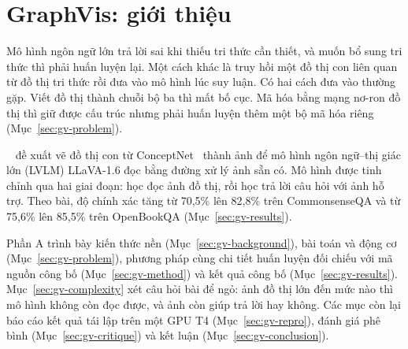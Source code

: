 \section{GraphVis: giới thiệu}\label{sec:gv-intro}

Mô hình ngôn ngữ lớn trả lời sai khi thiếu tri thức cần thiết, và muốn bổ sung tri thức thì phải huấn luyện lại. Một cách khác là truy hồi một đồ thị con liên quan từ đồ thị tri thức rồi đưa vào mô hình lúc suy luận. Có hai cách đưa vào thường gặp. Viết đồ thị thành chuỗi bộ ba thì mất bố cục. Mã hóa bằng mạng nơ-ron đồ thị thì giữ được cấu trúc nhưng phải huấn luyện thêm một bộ mã hóa riêng (Mục~\ref{sec:gv-problem}).

\GV{}~\cite{deng2024graphvis} đề xuất vẽ đồ thị con từ ConceptNet~\cite{speer2017conceptnet} thành ảnh để mô hình ngôn ngữ--thị giác lớn (LVLM) LLaVA-1.6 đọc bằng đường xử lý ảnh sẵn có. Mô hình được tinh chỉnh qua hai giai đoạn: học đọc ảnh đồ thị, rồi học trả lời câu hỏi với ảnh hỗ trợ. Theo bài, độ chính xác tăng từ 70,5\% lên 82,8\% trên CommonsenseQA và từ 75,6\% lên 85,5\% trên OpenBookQA (Mục~\ref{sec:gv-results}).

Phần A trình bày kiến thức nền (Mục~\ref{sec:gv-background}), bài toán và động cơ (Mục~\ref{sec:gv-problem}), phương pháp cùng chi tiết huấn luyện đối chiếu với mã nguồn công bố (Mục~\ref{sec:gv-method}) và kết quả công bố (Mục~\ref{sec:gv-results}). Mục~\ref{sec:gv-complexity} xét câu hỏi bài để ngỏ: ảnh đồ thị lớn đến mức nào thì mô hình không còn đọc được, và ảnh còn giúp trả lời hay không. Các mục còn lại báo cáo kết quả tái lập trên một GPU T4 (Mục~\ref{sec:gv-repro}), đánh giá phê bình (Mục~\ref{sec:gv-critique}) và kết luận (Mục~\ref{sec:gv-conclusion}).
